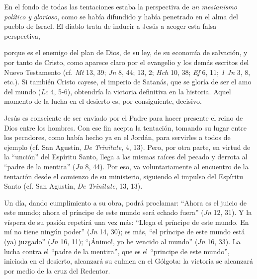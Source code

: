			\begin{patercite}En el fondo de todas las tentaciones estaba la perspectiva de \textit{un mesianismo político y} \textit{glorioso}, como se había difundido y había penetrado en el alma del pueblo de Israel. El diablo trata de inducir a Jesús a acoger esta falsa perspectiva, \end{patercite}
			
			\begin{patercite}porque es el enemigo del plan de Dios, de su ley, de su economía de salvación, y por tanto de Cristo, como aparece claro por el evangelio y los demás escritos del Nuevo Testamento (cf. \textit{Mt} 13, 39; \textit{Jn} 8, 44; 13, 2; \textit{Hch} 10, 38; \textit{Ef} 6, 11; \textit{1 Jn} 3, 8, etc.). Si también Cristo cayese, el imperio de Satanás, que se gloría de ser el amo del mundo (\textit{Lc} 4, 5-6), obtendría la victoria definitiva en la historia. Aquel momento de la lucha en el desierto es, por consiguiente, decisivo.\end{patercite}
			
			\begin{patercite}Jesús es consciente de ser enviado por el Padre para hacer presente el reino de Dios entre los hombres. Con ese fin acepta la tentación, tomando su lugar entre los pecadores, como había hecho ya en el Jordán, para servirles a todos de ejemplo (cf. San Agustín, \textit{De Trinitate}, 4, 13). Pero, por otra parte, en virtud de la “unción” del Espíritu Santo, llega a las mismas raíces del pecado y derrota al “padre de la mentira” (\textit{Jn} 8, 44). Por eso, va voluntariamente al encuentro de la tentación desde el comienzo de su ministerio, siguiendo el impulso del Espíritu Santo (cf. San Agustín, \textit{De Trinitate}, 13, 13).\end{patercite}
			
			\begin{patercite}Un día, dando cumplimiento a su obra, podrá proclamar: “Ahora es el juicio de este mundo; ahora el príncipe de este mundo será echado fuera” (\textit{Jn} 12, 31). Y la víspera de su pasión repetirá una vez más: “Llega el príncipe de este mundo. En mí no tiene ningún poder” (\textit{Jn} 14, 30); es más, “el príncipe de este mundo está (ya) juzgado” (\textit{Jn} 16, 11); “¡Ánimo!, yo he vencido al mundo” (\textit{Jn} 16, 33). La lucha contra el “padre de la mentira”, que es el “principe de este mundo”, iniciada en el desierto, alcanzará su culmen en el Gólgota: la victoria se alcanzará por medio de la cruz del Redentor.\end{patercite}
			
